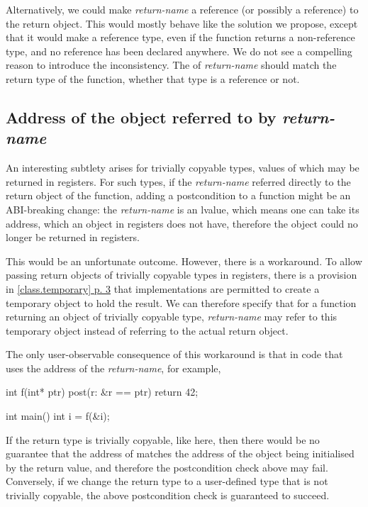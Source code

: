 Alternatively, we could make \emph{return-name} a reference (or possibly a  reference) to the return object. This would mostly behave like the solution we propose, except that it would make  a reference type, even if the function returns a non-reference type, and no reference has been declared anywhere. We do not see a compelling reason to introduce the  inconsistency. The  of \emph{return-name} should match the return type of the function, whether that type is a reference or not.

\subsection{Address of the object referred to by \emph{return-name}}

An interesting subtlety arises for trivially copyable types, values of which may be returned in registers. For such types, if the \emph{return-name} referred directly to the return object of the function, adding a postcondition to a function might be an ABI-breaking change: the \emph{return-name} is an lvalue, which means one can take its address, which an object in registers does not have, therefore the object could no longer be returned in registers.

This would be an unfortunate outcome. However, there is a workaround. To allow passing return objects of trivially copyable types in registers, there is a provision in \href{https://eel.is/c++draft/class.temporary#3}{[class.temporary] p. 3} that implementations are permitted to create a temporary object to hold the result. We can therefore specify that for a function returning an object of trivially copyable type, \emph{return-name} may refer to this temporary object instead of referring to the actual return object.

The only user-observable consequence of this workaround is that in code that uses the address of the \emph{return-name}, for example,

\begin{codeblock}
int f(int* ptr)
  post(r: &r == ptr)
{
  return 42;
}

int main() {
  int i = f(&i);
}
\end{codeblock}

If the return type is trivially copyable, like  here, then there would be no guarantee that the address of  matches the address of the object being initialised by the return value, and therefore the postcondition check above may fail. Conversely, if we change the return type to a user-defined type that is not trivially copyable, the above postcondition check is guaranteed to succeed.

